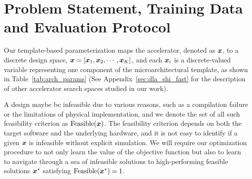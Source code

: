 \vspace{-0.2cm}
\section{Problem Statement, Training Data and Evaluation Protocol}
\label{sec:accel}
\vspace{-0.1cm}
%
Our template-based parameterization maps the accelerator, denoted as ${\boldsymbol{x}}$, to a discrete design space, ${\boldsymbol{x}} = [{\boldsymbol{x}}_1, {\boldsymbol{x}}_2, \cdots, {\boldsymbol{x}}_K]$, and each ${\boldsymbol{x}}_i$ is a discrete-valued variable representing one component of the microarchitectural template, as shown in Table~\ref{tab:arch_params} (See Appendix~\ref{sec:dla_shi_fast} for the description of other accelerator search spaces studied in our work).

%
A design maybe be infeasible due to various reasons, such as a compilation failure or the limitations of physical implementation, and we denote the set of all such feasibility criterion as $\mathrm{Feasible}({\boldsymbol{x}})$.
%
The feasibility criterion depends on both the target software and the underlying hardware, and it is not easy to identify if a given ${\boldsymbol{x}}$ is infeasible without explicit simulation. 
%
We will require our optimization procedure to not only learn the value of the objective function but also to learn to navigate through a sea of infeasible solutions to high-performing feasible solutions ${\boldsymbol{x}}^*$ satisfying $\mathrm{Feasible}({\boldsymbol{x}}^*) = 1$. 

